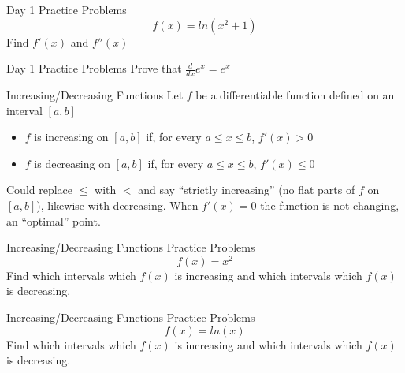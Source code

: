 \documentclass[aspectratio=169]{beamer}
\begin{document}
\begin{frame}{Day 1 Practice Problems}\label{main1}
	\vspace{-4cm}
    \[
    f(x) = ln(x^{2} + 1)
    \]
    Find \( f'(x) \) and \( f''(x) \)
\end{frame}

\begin{frame}{Day 1 Practice Problems}\label{main1}
	\vspace{-4cm}
    Prove that \( \frac{d}{dx}e^{x} = e^{x} \)
\end{frame}

\begin{frame}{Increasing/Decreasing Functions}\label{main1}
    Let $f$ be a differentiable function defined on an interval $[a, b]$
    \begin{itemize}
        \item $f$ is increasing on $[a, b]$ if, for every $a \leq x \leq b$, $f'(x) > 0$
        \item $f$ is decreasing on $[a, b]$ if, for every $a \leq x \leq b$, $f'(x) \leq 0$
    \end{itemize}
    Could replace $\leq$ with $<$ and say “strictly increasing” (no flat parts of $f$ on $[a, b]$), likewise with decreasing. When $f'(x) = 0$ the function is not changing, an “optimal” point.

\end{frame}

\begin{frame}{Increasing/Decreasing Functions Practice Problems}\label{main1}
	\vspace{-4cm}
     \[
    f(x) = x^{2}
    \]
    Find which intervals which \( f(x) \) is increasing and which intervals which \( f(x) \) is decreasing.
\end{frame}

\begin{frame}{Increasing/Decreasing Functions Practice Problems}\label{main1}
	\vspace{-4cm}
     \[
    f(x) = ln(x)
    \]
    Find which intervals which \( f(x) \) is increasing and which intervals which \( f(x) \) is decreasing.
\end{frame}
\end{document}

